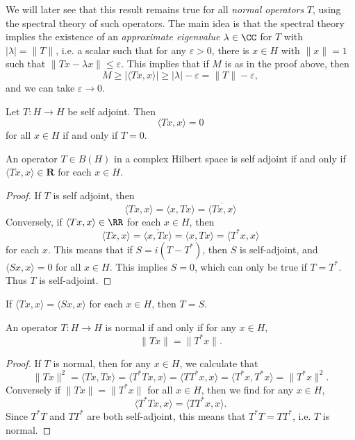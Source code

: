 \begin{remark}
    We will later see that this result remains true for all \emph{normal operators} $T$, using the spectral theory of such operators. The main idea is that the spectral theory implies the existence of an \emph{approximate eigenvalue} $\lambda \in \CC$ for $T$ with $|\lambda| = \| T \|$, i.e. a scalar such that for any $\varepsilon > 0$, there is $x \in H$ with $\| x \| = 1$ such that $\| Tx - \lambda x \| \leq \varepsilon$. This implies that if $M$ is as in the proof above, then
    \[ M \geq \left| \langle Tx, x \rangle \right| \geq |\lambda| - \varepsilon = \| T \| - \varepsilon, \]
    and we can take $\varepsilon \to 0$.
\end{remark}

\begin{corollary}
    Let $T: H \to H$ be self adjoint. Then
    \[ \langle Tx, x \rangle = 0 \]
    for all $x \in H$ if and only if $T = 0$.
\end{corollary}

\begin{lemma}
    An operator $T \in B(H)$ in a complex Hilbert space is self adjoint if and only if $\langle Tx, x \rangle \in \mathbf{R}$ for each $x \in H$.
\end{lemma}
\begin{proof}
    If $T$ is self adjoint, then
    \[ \langle Tx, x \rangle = \langle x, Tx \rangle = \overline{\langle Tx, x \rangle} \]
    Conversely, if $\langle Tx, x \rangle \in \RR$ for each $x \in H$, then
    \[ \langle Tx, x \rangle = \overline{\langle x, Tx \rangle} = \langle x, Tx \rangle = \langle T^*x, x \rangle \]
    for each $x$. This means that if $S = i(T - T^*)$, then $S$ is self-adjoint, and $\langle Sx, x \rangle = 0$ for all $x \in H$. This implies $S = 0$, which can only be true if $T = T^*$. Thus $T$ is self-adjoint.
\end{proof}

\begin{corollary}
    If $\langle Tx, x \rangle = \langle Sx, x \rangle$ for each $x \in H$, then $T = S$.
\end{corollary}

\begin{corollary}
    An operator $T: H \to H$ is normal if and only if for any $x \in H$,
    \[ \| Tx \| = \| T^*x \|. \]
\end{corollary}
\begin{proof}
    If $T$ is normal, then for any $x \in H$, we calculate that
    \[ \| Tx \|^2 = \langle Tx, Tx \rangle = \langle T^*Tx, x \rangle = \langle TT^*x, x \rangle = \langle T^*x, T^*x \rangle = \| T^* x \|^2. \]
    Conversely if $\| Tx \| = \| T^* x \|$ for all $x \in H$, then we find for any $x \in H$,
    \[ \langle T^*Tx, x \rangle = \langle TT^*x, x \rangle. \]
    Since $T^*T$ and $TT^*$ are both self-adjoint, this means that $T^*T = TT^*$, i.e. $T$ is normal.
\end{proof}

